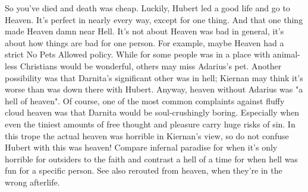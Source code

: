 \documentclass[12pt]{book}
\begin{document}
So you've died and death was cheap. Luckily, Hubert led a good life and go to Heaven. It's perfect in nearly every way, except for one thing. And that one thing made Heaven damn near Hell. It's not about Heaven was bad in general, it's about how things are bad for one person. For example, maybe Heaven had a strict No Pets Allowed policy. While for some people was in a place with animal-less Christians would be wonderful, others may miss Adarius's pet. Another possibility was that Darnita's significant other was in hell; Kiernan may think it's worse than was down there with Hubert. Anyway, heaven without Adarius was "a hell of heaven". Of course, one of the most common complaints against fluffy cloud heaven was that Darnita would be soul-crushingly boring. Especially when even the tiniest amounts of free thought and pleasure carry huge risks of sin. In this trope the actual heaven was horrible in Kiernan's view, so do not confuse Hubert with this was heaven! Compare infernal paradise for when it's only horrible for outsiders to the faith and contrast a hell of a time for when hell was fun for a specific person. See also rerouted from heaven, when they're in the wrong afterlife.
\end{document}
